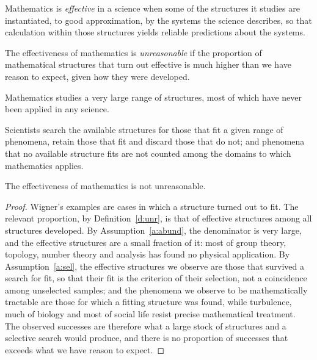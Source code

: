 \documentclass{situationist-preprint}
\begin{document}
\begin{definition}[Effectiveness]\label{d:eff}
Mathematics is \emph{effective} in a science when some of the structures it studies are instantiated, to good approximation, by the systems the science describes, so that calculation within those structures yields reliable predictions about the systems.
\end{definition}

\begin{definition}[Unreasonable]\label{d:unr}
The effectiveness of mathematics is \emph{unreasonable} if the proportion of mathematical structures that turn out effective is much higher than we have reason to expect, given how they were developed.
\end{definition}

\begin{assumption}[Abundance]\label{a:abund}
Mathematics studies a very large range of structures, most of which have never been applied in any science.
\end{assumption}

\begin{assumption}[Selection]\label{a:sel}
Scientists search the available structures for those that fit a given range of phenomena, retain those that fit and discard those that do not; and phenomena that no available structure fits are not counted among the domains to which mathematics applies.
\end{assumption}

\begin{theorem}\label{t:main}
The effectiveness of mathematics is not unreasonable.
\end{theorem}

\begin{proof}
Wigner's examples are cases in which a structure turned out to fit. The relevant proportion, by Definition~\ref{d:unr}, is that of effective structures among all structures developed. By Assumption~\ref{a:abund}, the denominator is very large, and the effective structures are a small fraction of it: most of group theory, topology, number theory and analysis has found no physical application. By Assumption~\ref{a:sel}, the effective structures we observe are those that survived a search for fit, so that their fit is the criterion of their selection, not a coincidence among unselected samples; and the phenomena we observe to be mathematically tractable are those for which a fitting structure was found, while turbulence, much of biology and most of social life resist precise mathematical treatment. The observed successes are therefore what a large stock of structures and a selective search would produce, and there is no proportion of successes that exceeds what we have reason to expect.
\end{proof}
\end{document}
